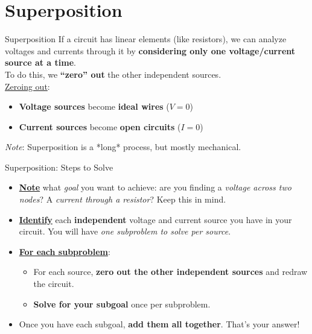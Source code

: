 \section{Superposition}

\begin{frame}{Superposition}
    If a circuit has linear elements (like resistors), we can analyze voltages and currents through it by \textbf{considering only one voltage/current source at a time}. \\[5pt]
    To do this, we \textbf{“zero” out} the other independent sources. \\[10pt]
    \underline{Zeroing out}:
    \begin{itemize}
        \item \textbf{Voltage sources} become \textbf{ideal wires} ($V = 0$)
        \item \textbf{Current sources} become \textbf{open circuits} ($I = 0$)
    \end{itemize}
    \textit{Note}: Superposition is a *long* process, but mostly mechanical.
\end{frame}

\begin{frame}{Superposition: Steps to Solve}
    \begin{itemize}
        \item \underline{\textbf{Note}} what \textit{goal} you want to achieve: are you finding a \textit{voltage across two nodes}? A \textit{current through a resistor}? Keep this in mind.
        \item \underline{\textbf{Identify}} each \textbf{independent} voltage and current source you have in your circuit. You will have \textit{one subproblem to solve per source}.
        \item \underline{\textbf{For each subproblem}}:
        \begin{itemize}
            \item For each source, \textbf{zero out the other independent sources} and redraw the circuit.
            \item \textbf{Solve for your subgoal} once per subproblem.
        \end{itemize}
        \item Once you have each subgoal, \textbf{add them all together}. That’s your answer!
    \end{itemize}
\end{frame}

